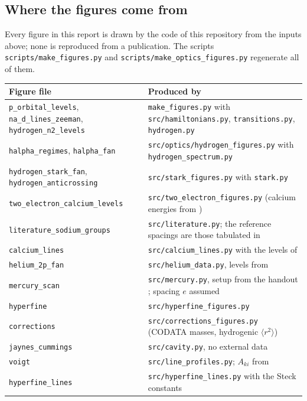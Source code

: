 \subsection{Where the figures come from}
Every figure in this report is drawn by the code of this repository from the inputs above; none is reproduced from a publication. The scripts \texttt{scripts/make\_figures.py} and \texttt{scripts/make\_optics\_figures.py} regenerate all of them.
\begin{center}
\small
\begin{tabular}{p{5.2cm}p{9cm}}
\toprule
Figure file & Produced by\\
\midrule
\texttt{p\_orbital\_levels}, \texttt{na\_d\_lines\_zeeman}, \texttt{hydrogen\_n2\_levels} & \texttt{make\_figures.py} with \texttt{src/hamiltonians.py}, \texttt{transitions.py}, \texttt{hydrogen.py}\\
\texttt{halpha\_regimes}, \texttt{halpha\_fan} & \texttt{src/optics/hydrogen\_figures.py} with \texttt{hydrogen\_spectrum.py}\\
\texttt{hydrogen\_stark\_fan}, \texttt{hydrogen\_anticrossing} & \texttt{src/stark\_figures.py} with \texttt{stark.py}\\
\texttt{two\_electron\_calcium\_levels} & \texttt{src/two\_electron\_figures.py} (calcium energies from \cite{nistca,cafreq})\\
\texttt{literature\_sodium\_groups} & \texttt{src/literature.py}; the reference spacings are those tabulated in \cite{arxiv2104}\\
\texttt{calcium\_lines} & \texttt{src/calcium\_lines.py} with the levels of \cite{nistca,cafreq}\\
\texttt{helium\_2p\_fan} & \texttt{src/helium\_data.py}, levels from \cite{nisthe,kato}\\
\texttt{mercury\_scan} & \texttt{src/mercury.py}, setup from the handout \cite{labtp}; spacing $e$ assumed\\
\texttt{hyperfine} & \texttt{src/hyperfine\_figures.py}\\
\texttt{corrections} & \texttt{src/corrections\_figures.py} (CODATA masses, hydrogenic $\langle r^2\rangle$)\\
\texttt{jaynes\_cummings} & \texttt{src/cavity.py}, no external data\\
\texttt{voigt} & \texttt{src/line\_profiles.py}; $A_{ki}$ from \cite{nistna}\\
\texttt{hyperfine\_lines} & \texttt{src/hyperfine\_lines.py} with the Steck constants\\

\end{tabular}
\end{center}
